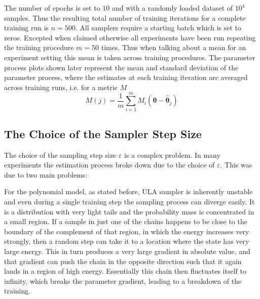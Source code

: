 The number of epochs is set to $10$ and with a randomly loaded dataset of $10^4$ samples.
Thus the resulting total number of training iterations for a complete training run is $n = 500$.
All samplers require a starting batch which is set to zeros.
Excepted when claimed otherwise all experiments have been run repeating the training procedure $m = 50$ times.
Thus when talking about a mean for an experiment setting this mean is taken across training procedures.
The parameter process plots shown later represent the mean and standard deviation of the parameter process, 
where the estimates at each training iteration are averaged across training runs, i.e. for a metric $M$ 
\[
	M (j) = \frac{1}{m}\sum_{i=1}^m M_i(\bm{\theta} - \hat{\bm{\theta}}_j )
\]

\subsection{The Choice of the Sampler Step Size}

The choice of the sampling step size $\varepsilon$ is a complex problem.
In many experiments the estimation process broke down due to the choice of $\varepsilon$.
This was due to two main problems:

For the polynomial model, as stated before, ULA sampler is inherently unstable and even during a single training step the sampling process can diverge easily.
It is a distribution with very light tails and the probability mass is concentrated in a small region.
If a sample in just one of the chains happens to be close to the boundary of the complement of that region, in which the energy increases very strongly,
then a random step can take it to a location where the state has very large energy.
This in turn produces a very large gradient in absolute value, and that gradient can push the chain in the opposite direction such that it again lands in a region of high energy.
Essentially this chain then fluctuates itself to infinity, which breaks the parameter gradient, leading to a breakdown of the training.

